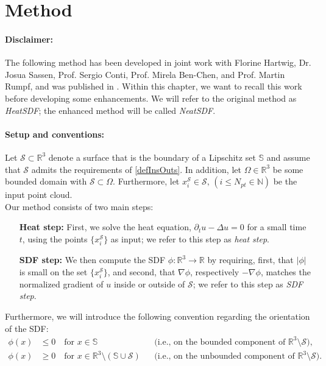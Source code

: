 \documentclass[draft,12pt,openany]{book}
\newcommand{\R}{\mathbb{R}}
\def\S{\mathcal{S}}
\theoremstyle{plainnormal}
\theoremstyle{remark}
\begin{document}
\section{Method}\label{section_SDFmethod}
\paragraph{Disclaimer:} The following method has been developed in joint work with Florine Hartwig, Dr. Josua Sassen, Prof. Sergio Conti, Prof. Mirela Ben-Chen, and Prof. Martin Rumpf, and was published in \cite{weidemaier2025sdfsunorientedpointclouds}. Within this chapter, we want to recall this work before developing some enhancements. We will refer to the original method as \emph{HeatSDF}; the enhanced method will be called \emph{NeatSDF}.
\paragraph{Setup and conventions:}
Let \(\mathcal{S} \subset \mathbb{R}^3\) denote a surface that is the boundary of a Lipschitz set \(\mathbb{S} \) and assume that $\S$ admits the requirements of \cref{defInsOuts}. In addition, let $\Omega \in \R^3$ be some bounded domain with $\S \subset \Omega$.
Furthermore, let $x^\S_i\in \mathcal{S}, \, (i \leq N_{pt}\in \mathbb N)$ be the input point cloud.\\
Our method consists of two main steps:
\begin{enumerate}[align=left]
\item[\textbf{Heat step:}]First, we solve the heat equation, $\partial_t u - \Delta u = 0$ for a small time $t$, using the points $\{x^\S_i\}$ as input; we refer to this step as \emph{heat step}.
\item[\textbf{SDF step:}]We then compute the SDF $\phi: \mathbb{R}^3\rightarrow\R$ by requiring, first, that $|\phi|$ is small on the set $\{x_i^\mathcal{S}\}$, and second, that $\nabla \phi$, respectively $-\nabla \phi$, matches the normalized gradient of $u$ inside or outside of $\mathcal{S}$; we refer to this step as \emph{SDF step}.
\end{enumerate}

Furthermore, we will introduce the following convention regarding the orientation of the SDF:
\begin{align*}
\phi(x) &\leq 0 \quad \text{for } x \in \mathbb S \, \,\, &&\text{(i.e., on the bounded component of }\R^3\setminus\mathcal{S}), \\ \phi(x) &\geq 0 \quad \text{for } x \in \mathbb{R}^3 \setminus (\mathbb{S} \cup \mathcal S)  &&\text{(i.e., on the unbounded component of }\R^3\setminus\mathcal{S}).   
\end{align*}
\end{document}
